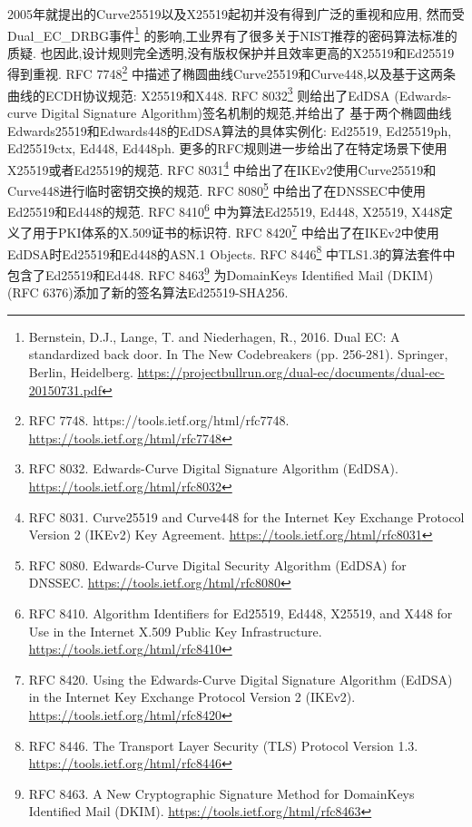 \documentclass{article}
\begin{document}
2005年就提出的Curve25519以及X25519起初并没有得到广泛的重视和应用,
然而受Dual_EC_DRBG事件\footnote{
Bernstein, D.J., Lange, T. and Niederhagen, R., 2016. Dual EC: A standardized back door. In The New Codebreakers (pp. 256-281). Springer, Berlin, Heidelberg.
\url{https://projectbullrun.org/dual-ec/documents/dual-ec-20150731.pdf}}
的影响,工业界有了很多关于NIST推荐的密码算法标准的质疑.
也因此,设计规则完全透明,没有版权保护并且效率更高的X25519和Ed25519得到重视.
RFC 7748\footnote{
RFC 7748. https://tools.ietf.org/html/rfc7748.
\url{https://tools.ietf.org/html/rfc7748}
}
中描述了椭圆曲线Curve25519和Curve448,以及基于这两条曲线的ECDH协议规范: X25519和X448.
RFC 8032\footnote{
RFC 8032. Edwards-Curve Digital Signature Algorithm (EdDSA).
\url{https://tools.ietf.org/html/rfc8032}
}
则给出了EdDSA (Edwards-curve Digital Signature Algorithm)签名机制的规范,并给出了
基于两个椭圆曲线Edwards25519和Edwards448的EdDSA算法的具体实例化: 
Ed25519, Ed25519ph, Ed25519ctx, Ed448, Ed448ph.
更多的RFC规则进一步给出了在特定场景下使用X25519或者Ed25519的规范.
RFC 8031\footnote{
RFC 8031. Curve25519 and Curve448 for the Internet Key Exchange Protocol Version 2 (IKEv2) Key Agreement. 
\url{https://tools.ietf.org/html/rfc8031}
}
中给出了在IKEv2使用Curve25519和Curve448进行临时密钥交换的规范.
RFC 8080\footnote{
RFC 8080. Edwards-Curve Digital Security Algorithm (EdDSA) for DNSSEC. 
\url{https://tools.ietf.org/html/rfc8080}
}
中给出了在DNSSEC中使用Ed25519和Ed448的规范.
RFC 8410\footnote{
RFC 8410. Algorithm Identifiers for Ed25519, Ed448, X25519, and X448 for Use in the Internet X.509 Public Key Infrastructure.
\url{https://tools.ietf.org/html/rfc8410}
}
中为算法Ed25519, Ed448, X25519, X448定义了用于PKI体系的X.509证书的标识符.
RFC 8420\footnote{
RFC 8420. Using the Edwards-Curve Digital Signature Algorithm (EdDSA) in the Internet Key Exchange Protocol Version 2 (IKEv2).
\url{https://tools.ietf.org/html/rfc8420}
}
中给出了在IKEv2中使用EdDSA时Ed25519和Ed448的ASN.1 Objects.
RFC 8446\footnote{
RFC 8446. The Transport Layer Security (TLS) Protocol Version 1.3.
\url{https://tools.ietf.org/html/rfc8446}
}
中TLS1.3的算法套件中包含了Ed25519和Ed448.
RFC 8463\footnote{
RFC 8463. A New Cryptographic Signature Method for DomainKeys Identified Mail (DKIM).
\url{https://tools.ietf.org/html/rfc8463}
}
为DomainKeys Identified Mail (DKIM) (RFC 6376)添加了新的签名算法Ed25519-SHA256.




\end{document}
